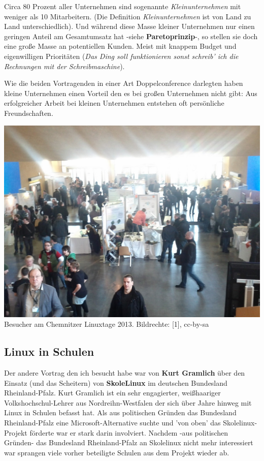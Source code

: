 \documentclass[10pt,a4paper,ngerman,twoside]{article} %
\begin{document}
\begin{multicols}{3}
Circa 80 Prozent aller Unternehmen sind sogenannte \textit{Kleinunternehmen} mit weniger als 10 Mitarbeitern. (Die Definition \textit{Kleinunternehmen} ist von Land zu Land unterschiedlich). Und während diese Masse kleiner Unternehmen nur einen geringen Anteil am Gesamtumsatz hat -siehe \textbf{Paretoprinzip}-, so stellen sie doch eine große Masse an potentiellen Kunden. Meist mit knappem Budget und eigenwilligen Prioritäten (\textit{Das Ding soll funktionieren sonst schreib' ich die Rechnungen mit der Schreibmaschine}). 

Wie die beiden Vortragenden in einer Art Doppelconference darlegten haben kleine Unternehmen einen Vorteil den es bei großen Unternehmen nicht gibt: Aus erfolgreicher Arbeit bei kleinen Unternehmen entstehen oft persönliche Freundschaften.

\begin{center}
\includegraphics[width=\linewidth]{chemnitz/chemnitz_messe.jpg}
\footnotesize{Besucher am Chemnitzer Linuxtage 2013. Bildrechte: [1], cc-by-sa}
\end{center}

\subsection*{Linux in Schulen}

Der andere Vortrag den ich besucht habe war von \textbf{Kurt Gramlich} über den Einsatz (und das Scheitern) von \textbf{SkoleLinux} im deutschen Bundesland Rheinland-Pfalz. Kurt Gramlich ist ein sehr engagierter, weißhaariger Volkshochschul-Lehrer aus Nordreihn-Westfalen der sich über Jahre hinweg mit Linux in Schulen befasst hat. Als aus politischen Gründen das Bundesland Rheinland-Pfalz eine Microsoft-Alternative suchte und 'von oben' das Skolelinux-Projekt förderte war er stark darin involviert. Nachdem -aus politischen Gründen- das Bundesland Rheinland-Pfalz an Skolelinux nicht mehr interessiert war sprangen viele vorher beteiligte Schulen aus dem Projekt wieder ab.


\end{multicols}
\end{document}
